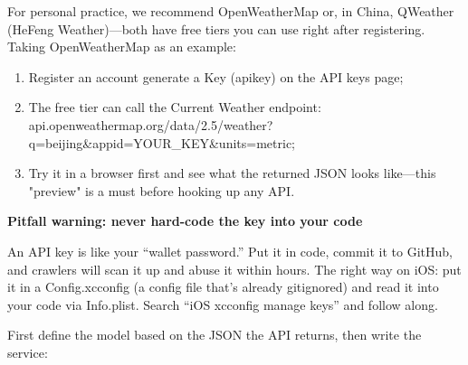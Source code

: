 


For personal practice, we recommend OpenWeatherMap or, in China, QWeather (HeFeng Weather)—both have free tiers you can use right after registering. Taking OpenWeatherMap as an example:

\begin{enumerate}
  \item Register an account generate a Key (apikey) on the API keys page;
  \item The free tier can call the Current Weather endpoint: api.openweathermap.org/data/2.5/weather? q=beijing\&appid=YOUR\_KEY\&units=metric;
  \item Try it in a browser first and see what the returned JSON looks like—this "preview" is a must before hooking up any API.
\end{enumerate}

\textbf{Pitfall warning: never hard-code the key into your code}\par

An API key is like your “wallet password.” Put it in code, commit it to GitHub, and crawlers will scan it up and abuse it within hours. The right way on iOS: put it in a Config.xcconfig (a config file that's already gitignored) and read it into your code via Info.plist. Search “iOS xcconfig manage keys” and follow along.


First define the model based on the JSON the API returns, then write the service:

